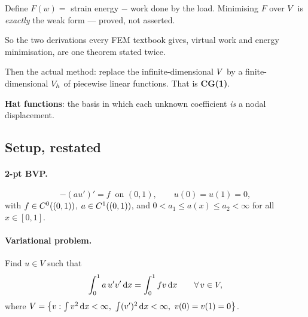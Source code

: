 
\begin{roadmap}[Lecture 3]
\begin{roadlist}
\item Define $F(w)=$ strain energy $-$ work done by the load. Minimising $F$
  over $\Vsp$ is \emph{exactly} the weak form --- proved, not asserted.
\item So the two derivations every FEM textbook gives, virtual work and energy
  minimisation, are one theorem stated twice.
\item Then the actual method: replace the infinite-dimensional $\Vsp$ by a
  finite-dimensional $\Vh$ of piecewise linear functions. That is
  \textbf{CG(1)}.
\item \textbf{Hat functions}: the basis in which each unknown coefficient
  \emph{is} a nodal displacement.
\end{roadlist}
\end{roadmap}

\subsection*{Setup, restated}

\paragraph{2-pt BVP.}
\begin{equation}\label{eq:bvp3}
  -(au')' = f \ \text{ on } (0,1),
  \qquad u(0)=u(1)=0,
\end{equation}
with $f\in\Ck[(0,1)]{0}$, $a\in\Ck[(0,1)]{1}$, and
$0 < a_{1} \le a(x) \le a_{2} < \infty$ for all $x\in[0,1]$.

\paragraph{Variational problem.}
Find $u\in V$ such that
\begin{equation}\label{eq:var3}
  \int_{0}^{1} a\,u'v'\dx = \int_{0}^{1} f v\dx
  \qquad \forall\, v\in V,
\end{equation}
where
$V = \bigl\{ v : \int v^{2}\dx<\infty,\ \int (v')^{2}\dx<\infty,\ v(0)=v(1)=0 \bigr\}$.

